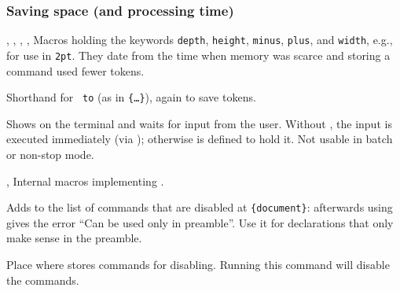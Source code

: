 \documentclass{l3in2edoc}
\begin{document}
\subsubsection{Saving space (and processing time)}

\begin{variable}[]
  {
    \@depth,
    \@height,
    \@minus,
    \@plus,
    \@width
  }
  Macros holding the keywords \texttt{depth}, \texttt{height},
  \texttt{minus}, \texttt{plus}, and \texttt{width}, e.g., for use in
  \texttt{2pt}. They date from the time when
  memory was scarce and storing a command used fewer tokens.
\end{variable}

\begin{function}[int]
  {
    \hb@xt@
  }
  Shorthand for \texttt{ to} (as in
  \texttt{\{\ldots\}}), again to save tokens.
\end{function}




\begin{function}[user]
  {
    \typein
  }
  \begin{syntax}
      
  \end{syntax}
  Shows  on the terminal and waits for input from the
  user. Without , the input is executed immediately
  (via ); otherwise  is defined to hold it. Not
  usable in batch or non-stop mode.
\end{function}



\begin{function}[int]
  {
    \@typein,
    \@xtypein
  }
  Internal macros implementing .
\end{function}



\begin{function}[]
  {
    \@onlypreamble
  }
  \begin{syntax}
  \end{syntax}
  Adds  to the list of commands that are disabled at
  \texttt{\{document\}}: afterwards using  gives
  the error \enquote{Can be used only in preamble}. Use it for
  declarations that only make sense in the preamble.
\end{function}



\begin{function}[]
  {
    \@preamblecmds
  }
  Place where  stores commands for
  disabling. Running this command will disable the commands.
\end{function}
\end{document}
